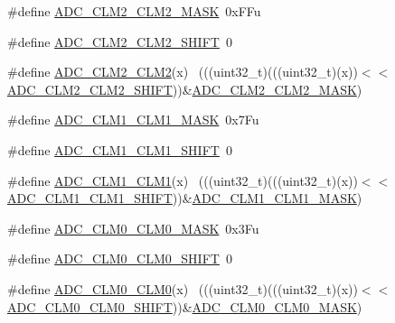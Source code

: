 \begin{DoxyCompactItemize}
\item 
\#define \hyperlink{group___a_d_c___register___masks_ga815d6f1bf2d38384c8fd0dd4f07f7a08}{A\+D\+C\+\_\+\+C\+L\+M2\+\_\+\+C\+L\+M2\+\_\+\+M\+A\+SK}~0x\+F\+Fu
\item 
\#define \hyperlink{group___a_d_c___register___masks_ga945ed262c088eecda09d679df33ab193}{A\+D\+C\+\_\+\+C\+L\+M2\+\_\+\+C\+L\+M2\+\_\+\+S\+H\+I\+FT}~0
\item 
\#define \hyperlink{group___a_d_c___register___masks_gaf9fff8bc3bc10df6ad470c1440f527d0}{A\+D\+C\+\_\+\+C\+L\+M2\+\_\+\+C\+L\+M2}(x)                                              ~(((uint32\+\_\+t)(((uint32\+\_\+t)(x))$<$$<$\hyperlink{group___a_d_c___register___masks_ga945ed262c088eecda09d679df33ab193}{A\+D\+C\+\_\+\+C\+L\+M2\+\_\+\+C\+L\+M2\+\_\+\+S\+H\+I\+FT}))\&\hyperlink{group___a_d_c___register___masks_ga815d6f1bf2d38384c8fd0dd4f07f7a08}{A\+D\+C\+\_\+\+C\+L\+M2\+\_\+\+C\+L\+M2\+\_\+\+M\+A\+SK})
\item 
\#define \hyperlink{group___a_d_c___register___masks_gaf576a4eb27b1478ea37a1b35bf6b869f}{A\+D\+C\+\_\+\+C\+L\+M1\+\_\+\+C\+L\+M1\+\_\+\+M\+A\+SK}~0x7\+Fu
\item 
\#define \hyperlink{group___a_d_c___register___masks_gae83765be6a54aab249c89a0f47afb023}{A\+D\+C\+\_\+\+C\+L\+M1\+\_\+\+C\+L\+M1\+\_\+\+S\+H\+I\+FT}~0
\item 
\#define \hyperlink{group___a_d_c___register___masks_ga4330bea003d35f36729b166bef5468c6}{A\+D\+C\+\_\+\+C\+L\+M1\+\_\+\+C\+L\+M1}(x)                                              ~(((uint32\+\_\+t)(((uint32\+\_\+t)(x))$<$$<$\hyperlink{group___a_d_c___register___masks_gae83765be6a54aab249c89a0f47afb023}{A\+D\+C\+\_\+\+C\+L\+M1\+\_\+\+C\+L\+M1\+\_\+\+S\+H\+I\+FT}))\&\hyperlink{group___a_d_c___register___masks_gaf576a4eb27b1478ea37a1b35bf6b869f}{A\+D\+C\+\_\+\+C\+L\+M1\+\_\+\+C\+L\+M1\+\_\+\+M\+A\+SK})
\item 
\#define \hyperlink{group___a_d_c___register___masks_ga2f9f36fb3b4eceab2198582865dc5b14}{A\+D\+C\+\_\+\+C\+L\+M0\+\_\+\+C\+L\+M0\+\_\+\+M\+A\+SK}~0x3\+Fu
\item 
\#define \hyperlink{group___a_d_c___register___masks_gaf5a5fd710a47f83c5ee3fd083f430a66}{A\+D\+C\+\_\+\+C\+L\+M0\+\_\+\+C\+L\+M0\+\_\+\+S\+H\+I\+FT}~0
\item 
\#define \hyperlink{group___a_d_c___register___masks_gaec2ba4c82cc108145d5e6263fbc44bc1}{A\+D\+C\+\_\+\+C\+L\+M0\+\_\+\+C\+L\+M0}(x)                                              ~(((uint32\+\_\+t)(((uint32\+\_\+t)(x))$<$$<$\hyperlink{group___a_d_c___register___masks_gaf5a5fd710a47f83c5ee3fd083f430a66}{A\+D\+C\+\_\+\+C\+L\+M0\+\_\+\+C\+L\+M0\+\_\+\+S\+H\+I\+FT}))\&\hyperlink{group___a_d_c___register___masks_ga2f9f36fb3b4eceab2198582865dc5b14}{A\+D\+C\+\_\+\+C\+L\+M0\+\_\+\+C\+L\+M0\+\_\+\+M\+A\+SK})
\end{DoxyCompactItemize}



